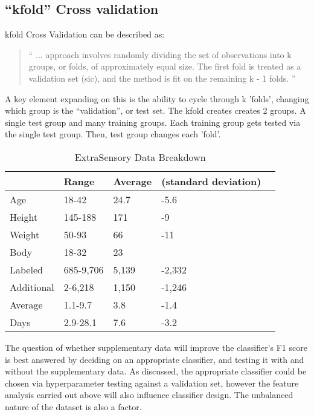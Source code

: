 \documentclass{UoNMCHA}
\newcommand{\inlineQuote}[1]{``#1''}
\newcommand{\fancyquote}[1]{\begin{quotation}\inlineQuote{#1}\end{quotation}}
\numberwithin{equation}{section}
\begin{document}
\subsection{\inlineQuote{kfold} Cross validation}
kfold Cross Validation can be described as:
\fancyquote{
    ... approach involves randomly dividing the set of observations into k groups, or folds, of approximately equal size. The first fold is treated as a validation set (sic), and the method is fit on the remaining k - 1 folds. 
    }\cite{James2017}
A key element expanding on this is the ability to cycle through k 'folds', changing which group is the \inlineQuote{validation}, or test set.
The kfold creates creates 2 groups. A single test group and many training groups. Each training group gets tested via the single test group. Then, test group changes each 'fold'.

\begin{table}[h]
    \begin{center}  
        \caption{ExtraSensory Data Breakdown \cite{Vaizman2017}}\label{tab:ExtraSensoryDataBreakdown}
        \begin{tabular}{lllll}
            \hline\hline 
                       & Range     & Average & (standard deviation) &  \\
            \hline 
            Age        & 18-42     & 24.7    & -5.6                 &  \\
            Height     & 145-188   & 171     & -9                   &  \\
            Weight     & 50-93     & 66      & -11                  &  \\
            Body       & 18-32     & 23      &                      &  \\
            Labeled    & 685-9,706 & 5,139   & -2,332               &  \\
            Additional & 2-6,218   & 1,150   & -1,246               &  \\
            Average    & 1.1-9.7   & 3.8     & -1.4                 &  \\
            Days       & 2.9-28.1  & 7.6     & -3.2 \\
            \hline  
            \end{tabular}
    \end{center}
\end{table}

The question of whether supplementary data will improve the classifier's F1 score is best answered by deciding on an appropriate classifier, and testing it with and without the supplementary data. As discussed, the appropriate classifier could be chosen via hyperparameter testing against a validation set, however the feature analysis carried out above will also influence classifier design. The unbalanced nature of the dataset is also a factor.
\end{document}
